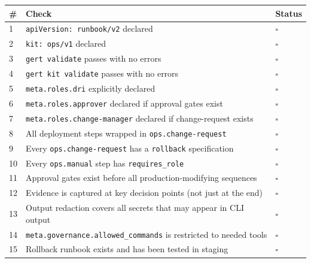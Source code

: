 \begin{center}
\small
\begin{tabular}{lp{8cm}l}
\textbf{\#} & \textbf{Check} & \textbf{Status} \\
\hline
1 & \texttt{apiVersion: runbook/v2} declared & $\square$ \\
2 & \texttt{kit: ops/v1} declared & $\square$ \\
3 & \texttt{gert validate} passes with no errors & $\square$ \\
4 & \texttt{gert kit validate} passes with no errors & $\square$ \\
5 & \texttt{meta.roles.dri} explicitly declared & $\square$ \\
6 & \texttt{meta.roles.approver} declared if approval gates exist & $\square$ \\
7 & \texttt{meta.roles.change-manager} declared if change-request exists & $\square$ \\
8 & All deployment steps wrapped in \texttt{ops.change-request} & $\square$ \\
9 & Every \texttt{ops.change-request} has a \texttt{rollback} specification & $\square$ \\
10 & Every \texttt{ops.manual} step has \texttt{requires\_role} & $\square$ \\
11 & Approval gates exist before all production-modifying sequences & $\square$ \\
12 & Evidence is captured at key decision points (not just at the end) & $\square$ \\
13 & Output redaction covers all secrets that may appear in CLI output & $\square$ \\
14 & \texttt{meta.governance.allowed\_commands} is restricted to needed tools & $\square$ \\
15 & Rollback runbook exists and has been tested in staging & $\square$ \\
\end{tabular}
\end{center}
